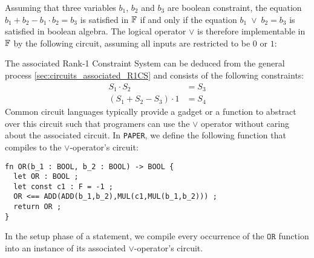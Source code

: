 Assuming that three variables $b_1$, $b_2$ and $b_3$ are boolean constraint, the equation $b_1 + b_2 - b_1\cdot b_2 = b_3$ is satisfied in $\mathbb{F}$ if and only if the equation $b_1 \; \vee \; b_2 = b_3$ is satisfied in boolean algebra. The logical operator $\vee$ is therefore implementable in $\mathbb{F}$ by the following circuit, assuming all inputs are restricted to be $0$ or $1$:
\begin{center}
\end{center}
The associated Rank-1 Constraint System can be deduced from the general process \ref{sec:circuits_associated_R1CS} and consists of the following constraints:
\begin{align*}
\label{def:boolean-or_constraints}
S_1 \cdot S_2 & = S_3\\
(S_1 + S_2 - S_3)\cdot 1 &= S_4
\end{align*}
Common circuit languages typically provide a gadget or a function to abstract over this circuit such that programers can use the $\vee$ operator without caring about the associated circuit. In \texttt{PAPER}, we define the following function that compiles to the $\vee$-operator's circuit:
\begin{lstlisting}
fn OR(b_1 : BOOL, b_2 : BOOL) -> BOOL {
  let OR : BOOL ;
  let const c1 : F = -1 ;
  OR <== ADD(ADD(b_1,b_2),MUL(c1,MUL(b_1,b_2))) ;
  return OR ;
}
\end{lstlisting}
In the setup phase of a statement, we compile every occurrence of the $\mathtt{OR}$ function into an instance of its associated $\vee$-operator's circuit.
